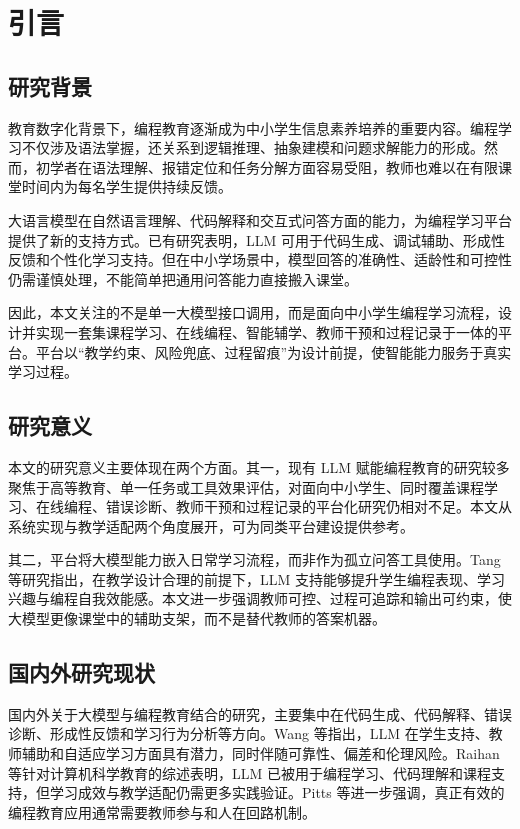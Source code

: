 \chapter{引言}

\section{研究背景}
教育数字化背景下，编程教育逐渐成为中小学生信息素养培养的重要内容。编程学习不仅涉及语法掌握，还关系到逻辑推理、抽象建模和问题求解能力的形成。然而，初学者在语法理解、报错定位和任务分解方面容易受阻，教师也难以在有限课堂时间内为每名学生提供持续反馈\cite{tsai2021cts}。

大语言模型在自然语言理解、代码解释和交互式问答方面的能力，为编程学习平台提供了新的支持方式。已有研究表明，LLM 可用于代码生成、调试辅助、形成性反馈和个性化学习支持\cite{wang2024llmedu,raihan2025cseduslr}。但在中小学场景中，模型回答的准确性、适龄性和可控性仍需谨慎处理，不能简单把通用问答能力直接搬入课堂。

因此，本文关注的不是单一大模型接口调用，而是面向中小学生编程学习流程，设计并实现一套集课程学习、在线编程、智能辅学、教师干预和过程记录于一体的平台。平台以“教学约束、风险兜底、过程留痕”为设计前提，使智能能力服务于真实学习过程。

\section{研究意义}
本文的研究意义主要体现在两个方面。其一，现有 LLM 赋能编程教育的研究较多聚焦于高等教育、单一任务或工具效果评估，对面向中小学生、同时覆盖课程学习、在线编程、错误诊断、教师干预和过程记录的平台化研究仍相对不足\cite{raihan2025cseduslr,yim2024k12scoping}。本文从系统实现与教学适配两个角度展开，可为同类平台建设提供参考。

其二，平台将大模型能力嵌入日常学习流程，而非作为孤立问答工具使用。Tang 等研究指出，在教学设计合理的前提下，LLM 支持能够提升学生编程表现、学习兴趣与编程自我效能感\cite{tang2025middleschool}。本文进一步强调教师可控、过程可追踪和输出可约束，使大模型更像课堂中的辅助支架，而不是替代教师的答案机器。

\section{国内外研究现状}
国内外关于大模型与编程教育结合的研究，主要集中在代码生成、代码解释、错误诊断、形成性反馈和学习行为分析等方向。Wang 等指出，LLM 在学生支持、教师辅助和自适应学习方面具有潜力，同时伴随可靠性、偏差和伦理风险\cite{wang2024llmedu}。Raihan 等针对计算机科学教育的综述表明，LLM 已被用于编程学习、代码理解和课程支持，但学习成效与教学适配仍需更多实践验证\cite{raihan2025cseduslr}。Pitts 等进一步强调，真正有效的编程教育应用通常需要教师参与和人在回路机制\cite{pitts2025llmprogedu}。

